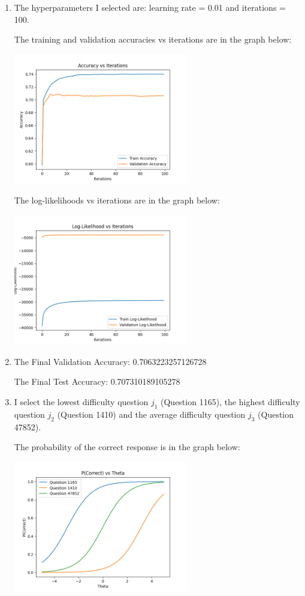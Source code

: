 \documentclass{article}
\begin{document}
\begin{enumerate}[label=(\alph*)]
    \item The hyperparameters I selected are: learning rate = 0.01 and iterations = 100.
    
    The training and validation accuracies vs iterations are in the graph below:
    \begin{center}
        \includegraphics[width=0.6\textwidth]{irt_accuracy.png}
    \end{center}

    The log-likelihoods vs iterations are in the graph below:
    \begin{center}
        \includegraphics[width=0.6\textwidth]{irt_llk.png}
    \end{center}

    \item The Final Validation Accuracy: 0.7063223257126728
    
    The Final Test Accuracy: 0.707310189105278

    \item I select the lowest difficulty question $j_1$ (Question 1165), the highest difficulty question $j_2$ (Question 1410) and the average difficulty question $j_3$ (Question 47852).

    The probability of the correct response is in the graph below:
    \begin{center}
        \includegraphics[width=0.6\textwidth]{irt_question.png}
    \end{center}


\end{enumerate}
\end{document}
